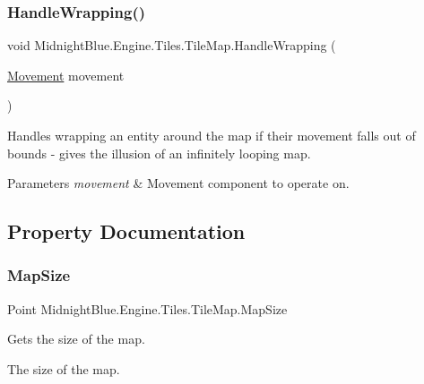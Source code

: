 \subsubsection{\texorpdfstring{Handle\+Wrapping()}{HandleWrapping()}}
{\footnotesize\ttfamily void Midnight\+Blue.\+Engine.\+Tiles.\+Tile\+Map.\+Handle\+Wrapping (\begin{DoxyParamCaption}\item[{\hyperlink{class_midnight_blue_1_1_engine_1_1_entity_component_1_1_movement}{Movement}}]{movement }\end{DoxyParamCaption})\hspace{0.3cm}{\ttfamily [inline]}}



Handles wrapping an entity around the map if their movement falls out of bounds -\/ gives the illusion of an infinitely looping map. 


\begin{DoxyParams}{Parameters}
{\em movement} & Movement component to operate on.\\
\hline
\end{DoxyParams}


\subsection{Property Documentation}
\hypertarget{class_midnight_blue_1_1_engine_1_1_tiles_1_1_tile_map_ac67e4df079e26f5383bc970f77a9ab3d}{}\label{class_midnight_blue_1_1_engine_1_1_tiles_1_1_tile_map_ac67e4df079e26f5383bc970f77a9ab3d} 
\subsubsection{\texorpdfstring{Map\+Size}{MapSize}}
{\footnotesize\ttfamily Point Midnight\+Blue.\+Engine.\+Tiles.\+Tile\+Map.\+Map\+Size\hspace{0.3cm}{\ttfamily [get]}}



Gets the size of the map. 

The size of the map.\hypertarget{class_midnight_blue_1_1_engine_1_1_tiles_1_1_tile_map_a2cac83aafbdbffe76d092adc29a32f60}{}\label{class_midnight_blue_1_1_engine_1_1_tiles_1_1_tile_map_a2cac83aafbdbffe76d092adc29a32f60} 
